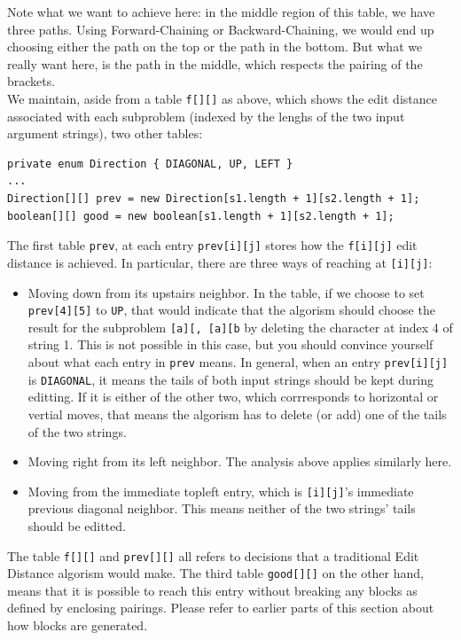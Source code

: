 \documentclass{article}
\begin{document}
Note what we want to achieve here: in the middle region of this table, we have three paths. Using Forward-Chaining or Backward-Chaining, we would end up choosing either the path on the top or the path in the bottom. But what we really want here, is the path in the middle, which respects the pairing of the brackets. \\

We maintain, aside from a table \texttt{f[][]} as above, which shows the edit distance associated with each subproblem (indexed by the lenghs of the two input argument strings), two other tables:
\begin{lstlisting}
private enum Direction { DIAGONAL, UP, LEFT }
...
Direction[][] prev = new Direction[s1.length + 1][s2.length + 1];
boolean[][] good = new boolean[s1.length + 1][s2.length + 1];
\end{lstlisting}
The first table \texttt{prev}, at each entry \texttt{prev[i][j]} stores how the \texttt{f[i][j]} edit distance is achieved. In particular, there are three ways of reaching at \texttt{[i][j]}:
\begin{itemize}
  \item Moving down from its upstairs neighbor. In the table, if we choose to set \texttt{prev[4][5]} to \texttt{UP}, that would indicate that the algorism should choose the result for the subproblem \texttt{[a][, [a][b} by deleting the character at index 4 of string 1. This is not possible in this case, but you should convince yourself about what each entry in \texttt{prev} means. In general, when an entry \texttt{prev[i][j]} is \texttt{DIAGONAL}, it means the tails of both input strings should be kept during editting. If it is either of the other two, which corrresponds to horizontal or vertial moves, that means the algorism has to delete (or add) one of the tails of the two strings.
  \item Moving right from its left neighbor. The analysis above applies similarly here. 
  \item Moving from the immediate topleft entry, which is \texttt{[i][j]}'s immediate previous diagonal neighbor. This means neither of the two strings' tails should be editted. 
\end{itemize}
The table \texttt{f[][]} and \texttt{prev[][]} all refers to decisions that a traditional Edit Distance algorism would make. The third table \texttt{good[][]} on the other hand, means that it is possible to reach this entry without breaking any blocks as defined by enclosing pairings. Please refer to earlier parts of this section about how blocks are generated.\\
\end{document}
